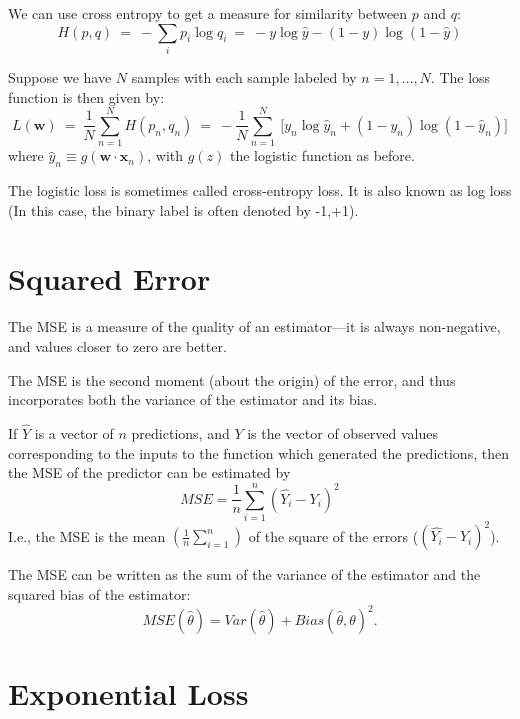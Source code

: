 \documentclass[hyperref, UTF-8]{ctexart}
\begin{document}
We can use cross entropy to get a measure for similarity between $p$ and $q$:
\begin{displaymath}
H(p,q)\ =\ -\sum _{i}p_{i}\log q_{i}\ =\ -y\log {\hat {y}}-(1-y)\log(1-{\hat {y}})
\end{displaymath}

Suppose we have $N$ samples with each sample labeled by $n=1,\dots ,N$. The loss function is then given by:
\begin{displaymath}
 L(\mathbf {w} )\ =\ {\frac {1}{N}}\sum _{n=1}^{N}H(p_{n},q_{n})\ =\ -{\frac
   {1}{N}}\sum _{n=1}^{N}\ {\bigg [}y_{n}\log {\hat
   {y}}_{n}+(1-y_{n})\log(1-{\hat {y}}_{n}){\bigg ]}
\end{displaymath}
where ${\hat  {y}}_{n}\equiv g({\mathbf  {w}}\cdot {\mathbf  {x}}_{n})$, with $g(z)$ the logistic function as before.

The logistic loss is sometimes called cross-entropy loss. It is also known as log loss (In this case, the binary label is often denoted by {-1,+1}).
\section{Squared Error}
The MSE is a measure of the quality of an estimator—it is always non-negative, and values closer to zero are better.~\cite{mseloss}

The MSE is the second moment (about the origin) of the error, and thus
incorporates both the variance of the estimator and its bias.

If $\hat{Y}$ is a vector of $n$ predictions, and $Y$ is the vector of observed values corresponding to the inputs to the function which generated the predictions, then the MSE of the predictor can be estimated by
\begin{displaymath}
 {MSE}={\frac  {1}{n}}\sum_{{i=1}}^{n}({\hat  {Y_{i}}}-Y_{i})^{2}
\end{displaymath}
I.e., the MSE is the mean \begin{math}\left({\frac {1}{n}}\sum_{i=1}^{n}\right)\end{math} of the square of the errors ($({\hat  {Y_{i}}}-Y_{i})^{2}$).

The MSE can be written as the sum of the variance of the estimator and the
squared bias of the estimator:
\begin{displaymath}
{MSE} ({\hat {\theta }})= {Var} ({\hat {\theta }})+ {Bias} ({\hat {\theta }},\theta )^{2}.  
\end{displaymath}
\section{Exponential Loss}
\end{document}
